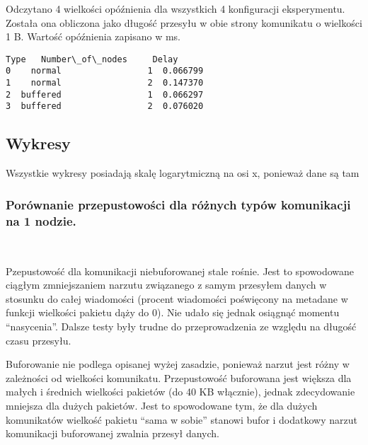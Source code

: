 \documentclass[11pt]{article}
\begin{document}
Odczytano 4 wielkości opóźnienia dla wszystkich 4 konfiguracji
eksperymentu. Została ona obliczona jako długość przesyłu w obie strony
komunikatu o wielkości 1 B. Wartość opóźnienia zapisano w ms.

            \begin{tcolorbox}[breakable, size=fbox, boxrule=.5pt, pad at break*=1mm, opacityfill=0]
\begin{Verbatim}[commandchars=\\\{\}]
       Type   Number\_of\_nodes     Delay
0    normal                 1  0.066799
1    normal                 2  0.147370
2  buffered                 1  0.066297
3  buffered                 2  0.076020
\end{Verbatim}
\end{tcolorbox}
        
    \hypertarget{wykresy}{%
\subsection{Wykresy}\label{wykresy}}

Wszystkie wykresy posiadają skalę logarytmiczną na osi x, ponieważ dane
są tam

    \hypertarget{poruxf3wnanie-przepustowoux15bci-dla-ruxf3ux17cnych-typuxf3w-komunikacji-na-1-nodzie.}{%
\subsubsection{Porównanie przepustowości dla różnych typów komunikacji
na 1
nodzie.}\label{poruxf3wnanie-przepustowoux15bci-dla-ruxf3ux17cnych-typuxf3w-komunikacji-na-1-nodzie.}}

    \begin{center}
    \end{center}
    { \hspace*{\fill} \\}
    
    Pzepustowość dla komunikacji niebuforowanej stale rośnie. Jest to
spowodowane ciągłym zmniejszaniem narzutu związanego z samym przesyłem
danych w stosunku do całej wiadomości (procent wiadomości poświęcony na
metadane w funkcji wielkości pakietu dąży do 0). Nie udało się jednak
osiągnąć momentu ``nasycenia''. Dalsze testy były trudne do
przeprowadzenia ze względu na długość czasu przesyłu.

Buforowanie nie podlega opisanej wyżej zasadzie, ponieważ narzut jest
różny w zależności od wielkości komunikatu. Przepustowość buforowana
jest większa dla małych i średnich wielkości pakietów (do 40 KB
włącznie), jednak zdecydowanie mniejsza dla dużych pakietów. Jest to
spowodowane tym, że dla dużych komunikatów wielkość pakietu ``sama w
sobie'' stanowi bufor i dodatkowy narzut komunikacji buforowanej zwalnia
przesył danych.
\end{document}
